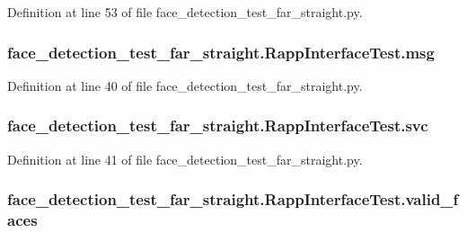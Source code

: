 Definition at line 53 of file face\-\_\-detection\-\_\-test\-\_\-far\-\_\-straight.\-py.

\hypertarget{classface__detection__test__far__straight_1_1RappInterfaceTest_af94b85f973ae379d01ba0ecf9fa3113a}{
\subsubsection[{msg}]{\setlength{\rightskip}{0pt plus 5cm}face\-\_\-detection\-\_\-test\-\_\-far\-\_\-straight.\-Rapp\-Interface\-Test.\-msg}}\label{classface__detection__test__far__straight_1_1RappInterfaceTest_af94b85f973ae379d01ba0ecf9fa3113a}


Definition at line 40 of file face\-\_\-detection\-\_\-test\-\_\-far\-\_\-straight.\-py.

\hypertarget{classface__detection__test__far__straight_1_1RappInterfaceTest_a056cb00672cae20c519819343e32f77c}{
\subsubsection[{svc}]{\setlength{\rightskip}{0pt plus 5cm}face\-\_\-detection\-\_\-test\-\_\-far\-\_\-straight.\-Rapp\-Interface\-Test.\-svc}}\label{classface__detection__test__far__straight_1_1RappInterfaceTest_a056cb00672cae20c519819343e32f77c}


Definition at line 41 of file face\-\_\-detection\-\_\-test\-\_\-far\-\_\-straight.\-py.

\hypertarget{classface__detection__test__far__straight_1_1RappInterfaceTest_a5d1d6a84a96556e5f36d47b283174aba}{
\subsubsection[{valid\-\_\-faces}]{\setlength{\rightskip}{0pt plus 5cm}face\-\_\-detection\-\_\-test\-\_\-far\-\_\-straight.\-Rapp\-Interface\-Test.\-valid\-\_\-faces}}\label{classface__detection__test__far__straight_1_1RappInterfaceTest_a5d1d6a84a96556e5f36d47b283174aba}



